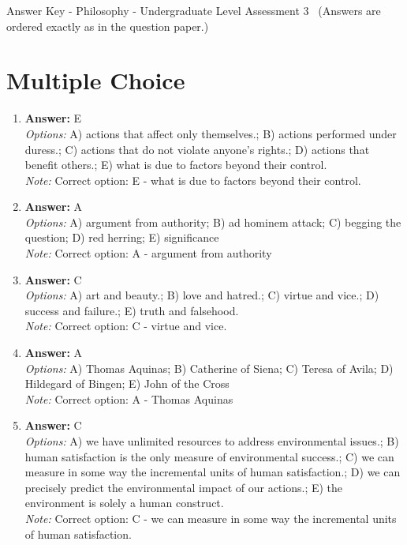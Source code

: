\documentclass[12pt]{article}
\begin{document}
\begin{center}
Answer Key - Philosophy - Undergraduate Level Assessment 3 \
\small (Answers are ordered exactly as in the question paper.)
\end{center}

\section*{Multiple Choice}
\begin{enumerate}[label=\arabic*.]
\item \textbf{Answer:} E
\\ \textit{Options:} A) actions that affect only themselves.; B) actions performed under duress.; C) actions that do not violate anyone's rights.; D) actions that benefit others.; E) what is due to factors beyond their control.
\\ \textit{Note:} Correct option: E - what is due to factors beyond their control.
\item \textbf{Answer:} A
\\ \textit{Options:} A) argument from authority; B) ad hominem attack; C) begging the question; D) red herring; E) significance
\\ \textit{Note:} Correct option: A - argument from authority
\item \textbf{Answer:} C
\\ \textit{Options:} A) art and beauty.; B) love and hatred.; C) virtue and vice.; D) success and failure.; E) truth and falsehood.
\\ \textit{Note:} Correct option: C - virtue and vice.
\item \textbf{Answer:} A
\\ \textit{Options:} A) Thomas Aquinas; B) Catherine of Siena; C) Teresa of Avila; D) Hildegard of Bingen; E) John of the Cross
\\ \textit{Note:} Correct option: A - Thomas Aquinas
\item \textbf{Answer:} C
\\ \textit{Options:} A) we have unlimited resources to address environmental issues.; B) human satisfaction is the only measure of environmental success.; C) we can measure in some way the incremental units of human satisfaction.; D) we can precisely predict the environmental impact of our actions.; E) the environment is solely a human construct.
\\ \textit{Note:} Correct option: C - we can measure in some way the incremental units of human satisfaction.
\end{enumerate}
\end{document}
